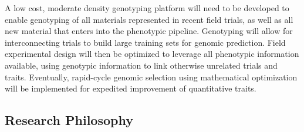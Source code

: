 \documentclass[11pt]{article}
\begin{document}
A low cost, moderate density genotyping platform will need to be developed to enable genotyping of all materials represented in recent field trials, as well as all new material that enters into the phenotypic pipeline. Genotyping will allow for interconnecting trials to build large training sets for genomic prediction. Field experimental design will then be optimized to leverage all phenotypic information available, using genotypic information to link otherwise unrelated trials and traits. Eventually, rapid-cycle genomic selection using mathematical optimization will be implemented for expedited improvement of quantitative traits.






\subsection*{Research Philosophy}
\end{document}
